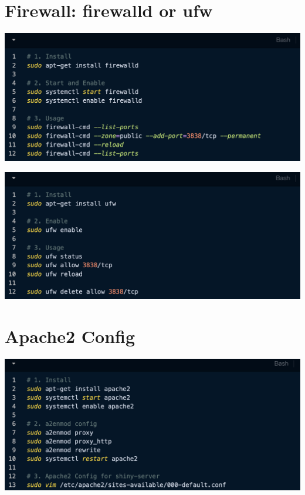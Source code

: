 \documentclass[
]{book}
\begin{document}
\section{Firewall: firewalld or ufw}\label{firewall-firewalld-or-ufw}

\begin{center}\includegraphics[width=24.75in]{figure/3.5.1} \end{center}

\begin{center}\includegraphics[width=24.78in]{figure/3.5.2} \end{center}

\section{Apache2 Config}\label{apache2-config}

\begin{center}\includegraphics[width=24.92in]{figure/3.6.1} \end{center}
\end{document}
